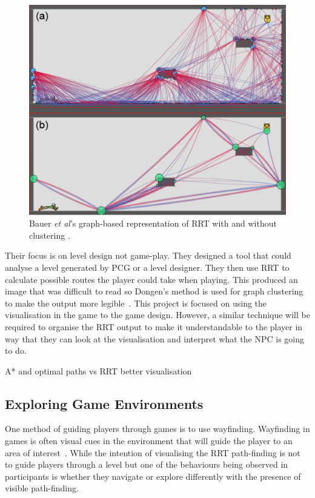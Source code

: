 \documentclass[journal]{IEEEtran}
\begin{document}
\begin{figure}[h]
	\includegraphics[width=1.0\linewidth]{BauerRRT.png}
	\caption{ Bauer \textit{et al}'s graph-based representation of RRT with and without clustering \cite{bauer2012}.}
	\label{BauerRRT}
\end{figure} 

Their focus is on level design not game-play. They designed a tool that could analyse a level generated by PCG or a level designer. They then use RRT to calculate possible routes the player could take when playing. This produced an image that was difficult to read so Dongen's method is used for graph clustering to make the output more legible~\cite{bauer2012, van2001}.  This project is focused on using the visualisation in the game to the game design. However, a similar technique will be required to organise the RRT output to make it understandable to the player in way that they can look at the visualisation and interpret what the NPC is going to do. 


A* and optimal paths vs RRT better visualisation 


\subsection{Exploring Game Environments}
One method of guiding players through games is to use wayfinding. Wayfinding in games is often visual cues in the environment that will guide the player to an area of interest~\cite{si2017, Bacim2008}. While the intention of visualising the RRT path-finding is not to guide players through a level but one of the behaviours being observed in participants is whether they  navigate or explore differently with the presence of visible path-finding. 
\end{document}
